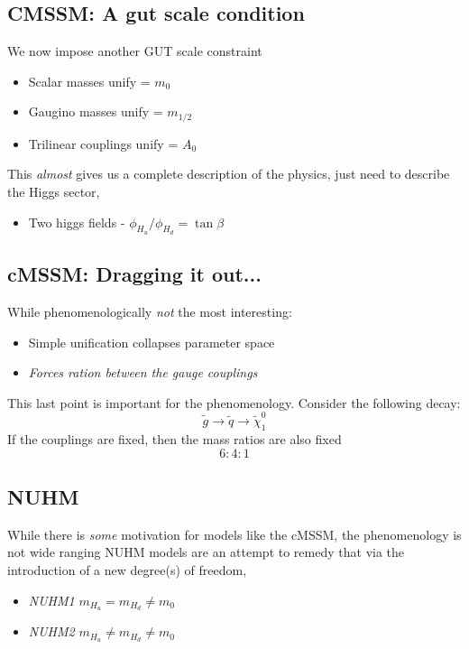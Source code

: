 \documentclass{beamer}
\newcommand{\mHu}{m_{H_{u}}}
\newcommand{\mHd}{m_{H_{d}}}
\begin{document}
\subsection{CMSSM: A gut scale condition}
\begin{frame}{\insertsubsection}
We now impose another GUT scale constraint
\begin{itemize}
    \item Scalar masses unify = $m_{0}$
    \item Gaugino masses unify = $m_{1/2}$
    \item Trilinear couplings unify = $A_{0}$
\end{itemize}
This \emph{almost} gives us a complete description of the physics, just need to
describe the Higgs sector,
\begin{itemize}
    \item Two higgs fields - $\phi_{H_{u}}/\phi_{H_{d}} = \tan\beta$
\end{itemize}

\end{frame}

\subsection{cMSSM: Dragging it out...}
\begin{frame}{\insertsubsection}
While phenomenologically \emph{not} the most interesting:
\begin{itemize}
    \item Simple unification collapses parameter space
    \item \emph{Forces ration between the gauge couplings}
\end{itemize}
This last point is important for the phenomenology.  Consider the following
decay:
\begin{equation*}
    \tilde{g}\rightarrow\tilde{q}\rightarrow\tilde{\chi}^{0}_{1}
\end{equation*}
If the couplings are fixed, then the mass ratios are also fixed
\begin{equation*}
    6:4:1
\end{equation*}
\end{frame}

\subsection{NUHM}
\begin{frame}{\insertsubsection}
While there is \textit{some} motivation for models like the cMSSM, the
phenomenology is not wide ranging  NUHM models are an attempt to remedy that via
the introduction of a new degree(s) of freedom,
\begin{itemize}
    \item \emph{NUHM1} $\mHu = \mHd \neq m_{0}$
    \item \emph{NUHM2} $\mHu \neq \mHd \neq m_{0}$
\end{itemize}
\end{frame}
\end{document}
